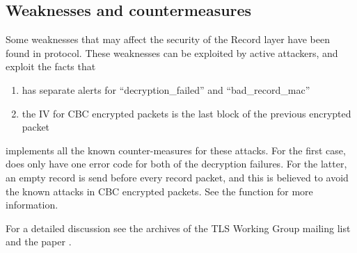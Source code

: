 \subsection{Weaknesses and countermeasures}

Some weaknesses that may affect the security of the Record layer have been
found in \tlsI{} protocol. These weaknesses can be exploited by active attackers,
and exploit the facts that \tls{} 
\begin{enumerate}
\item has separate alerts for ``decryption\_failed'' and ``bad\_record\_mac''
\item the IV for CBC encrypted packets is the last block of the previous encrypted packet
\end{enumerate}

\gnutls{} implements all the known counter-measures for these attacks. For the first
case, \gnutls{} does only have one error code for both of the decryption failures.
For the latter, an empty record is send before every record packet, and this is
believed to avoid the known attacks in CBC encrypted packets. See the function
for more information.

For a detailed discussion see the archives of the TLS Working Group mailing list
and the paper \cite{CBCATT}.

